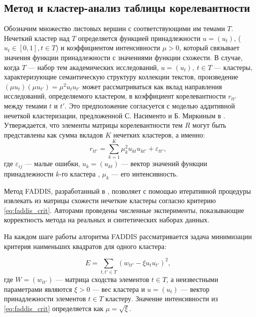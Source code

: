 \documentclass[12pt]{article}
\renewcommand{\epsilon}{\varepsilon}
\let\oldsubsection\subsection
\renewcommand{\subsection}{\clearpage\oldsubsection}
\begin{document}
\subsection{Метод и кластер-анализ таблицы корелевантности}

Обозначим множество листовых вершин с соответствующими им темами $T$. Нечеткий кластер над $T$ определяется функцией принадлежности $u=(u_t)$, ($u_t\in[0,1], t\in T$) и коэффициентом интенсивности $\mu>0$, который связывает значения функции принадлежности с значениями функции схожести. В случае, когда $T$ --- набор тем академических исследований, $u=(u_t),\ t\in T$ --- кластеры, характеризующие семантическую структуру коллекции текстов, произведение $(\mu u_t)(\mu u_{t'}) = \mu^2u_tu_{t'}$ может рассматриваться как вклад направления исследований, определяемого кластером, в коэффициент корелевантности $r_{tt'}$ между темами $t$ и $t'$. Это предположение согласуется с моделью аддитивной нечеткой кластеризации, предложенной С. Насименто и Б. Миркиным в \cite{mirkin2009analysis}. Утверждается, что элементы матрицы корелевантности тем $R$ могут быть представлены как сумма вкладов $K$ нечетких кластеров, а именно:
\begin{equation}
	r_{tt'}=\sum_{k=1}^{K}\mu_k^2u_{kt}u_{kt'} + \epsilon_{tt'},
	\label{eq:faddis_crit}
\end{equation}
где $\epsilon_{ij}$ --- малые ошибки, $u_k=(u_{kt})$ --- вектор значений функции принадлежности $k$-го кластера , $\mu_k$ --- его интенсивность. 

Метод FADDIS, разработанный в \cite{mirkin2009analysis, mirkin2012additive, nascimento2013laplacian}, позволяет с помощью итеративной процедуры извлекать из матрицы схожести нечеткие кластеры согласно критерию \eqref{eq:faddis_crit}. Авторами проведены численные эксперименты, показывающие корректность метода на реальных и синтетических наборах данных.

На каждом шаге работы алгоритма FADDIS рассматривается задача минимизации критерия наименьших квадратов для одного кластера:

\begin{equation}
	E=\sum_{t,t'\in T}(w_{tt'}-\xi u_t u_{t'})^2,
	\label{eq:faddis_onestep_crit}
\end{equation}
где $W=(w_{tt'})$ --- матрица сходства элементов $t\in T$, а неизвестными параметрами являются $\xi>0$ --- вес кластера и $u=(u_t)$ --- вектор принадлежности элементов $t\in T$ кластеру. Значение интенсивности из \eqref{eq:faddis_crit} определяется как $\mu=\sqrt{\xi}$.
\end{document}
